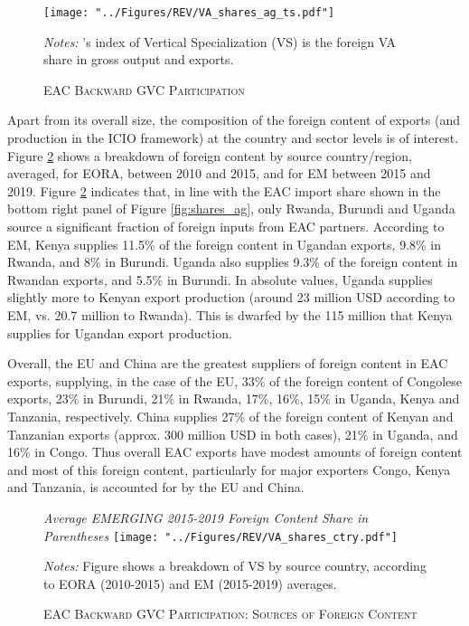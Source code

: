\documentclass[a4paper]{article}
\begin{document}
\begin{figure}[h!]
\centering
\caption{\label{fig:EACVB_ag_ts}\textsc{EAC Backward GVC Participation}}
\texttt{[image: "../Figures/REV/VA\_shares\_ag\_ts.pdf"]} %
\raggedright
\scriptsize
\emph{Notes:} \citet{hummels2001nature}'s index of Vertical Specialization (VS) is the foreign VA share in gross output and exports. 
\end{figure}
\FloatBarrier

Apart from its overall size, the composition of the foreign content of exports (and production in the ICIO framework) at the country and sector levels is of interest. Figure \ref{fig:EACVB_ctry} shows a breakdown of foreign content by source country/region, averaged, for EORA, between 2010 and 2015, and for EM between 2015 and 2019. Figure \ref{fig:EACVB_ctry} indicates that, in line with the EAC import share shown in the bottom right panel of Figure \ref{fig:shares_ag}, only Rwanda, Burundi and Uganda source a significant fraction of foreign inputs from EAC partners. According to EM, Kenya supplies 11.5\% of the foreign content in Ugandan exports, 9.8\% in Rwanda, and 8\% in Burundi. Uganda also supplies 9.3\% of the foreign content in Rwandan exports, and 5.5\% in Burundi. In absolute values, Uganda supplies slightly more to Kenyan export production (around 23 million USD according to EM, vs. 20.7 million to Rwanda). This is dwarfed by the 115 million that Kenya supplies for Ugandan export production. \newline 

Overall, the EU and China are the greatest suppliers of foreign content in EAC exports, supplying, in the case of the EU, 33\% of the foreign content of Congolese exports, 23\% in Burundi, 21\% in Rwanda, 17\%, 16\%, 15\% in Uganda, Kenya and Tanzania, respectively. China supplies 27\% of the foreign content of Kenyan and Tanzanian exports (approx. 300 million USD in both cases), 21\% in Uganda, and 16\% in Congo. Thus overall EAC exports have modest amounts of foreign content and most of this foreign content, particularly for major exporters Congo, Kenya and Tanzania, is accounted for by the EU and China. 

\begin{figure}[h!]
\centering
\caption{\label{fig:EACVB_ctry}\textsc{EAC Backward GVC Participation: Sources of Foreign Content}}
\small{\textit{Average EMERGING 2015-2019 Foreign Content Share in Parentheses}}
\vspace{2mm}
\texttt{[image: "../Figures/REV/VA\_shares\_ctry.pdf"]} \\ %
\raggedright
\scriptsize
\vspace{-2mm}
\emph{Notes:} Figure shows a breakdown of VS by source country, according to EORA (2010-2015) and EM (2015-2019) averages. \\ \vspace{-5mm}
\end{figure}
\FloatBarrier
\end{document}

